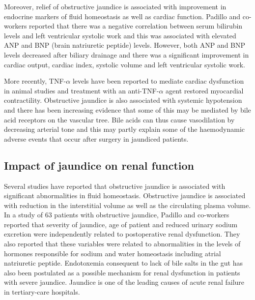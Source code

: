 Moreover, relief of obstructive jaundice is associated with improvement in endocrine markers of fluid homeostasis as well as cardiac function. \parencite{padillo_improved_2001, gallardo_increased_1998} Padillo and co-workers reported that there was a negative correlation between serum bilirubin levels and left ventricular systolic work and this was associated with elevated ANP and BNP (brain natriuretic peptide) levels. However, both ANP and BNP levels decreased after biliary drainage and there was a significant improvement in cardiac output, cardiac index, systolic volume and left ventricular systolic work.\parencite{padillo_improved_2001}
	
More recently, TNF-$\alpha$ levels have been reported to mediate cardiac dysfunction in animal studies and treatment with an anti-TNF-$\alpha$ agent restored myocardial contractility.\parencite{yang_mechanisms_2010} Obstructive jaundice is also associated with systemic hypotension and there has been increasing evidence that some of this may be mediated by bile acid receptors on the vascular tree.\parencite{green_systemic_1995, lefebvre_role_2009} Bile acids can thus cause vasodilation by decreasing arterial tone and this may partly explain some of the haemodynamic adverse events that occur after surgery in jaundiced patients.

\subsection{Impact of jaundice on renal function}

Several studies have reported that obstructive jaundice is associated with significant abnormalities in fluid homeostasis. Obstructive jaundice is associated with reduction in the interstitial volume as well as the circulating plasma volume.\parencite{sitges-serra_body_1992, padillo_preoperative_1999} In a study of 63 patients with obstructive jaundice, Padillo and co-workers reported that severity of jaundice, age of patient and reduced urinary sodium excretion were independently related to postoperative renal dysfunction. They also reported that these variables were related to abnormalities in the levels of hormones responsible for sodium and water homeostasis including atrial natriuretic peptide.\parencite{padillo_multivariate_2005} Endotoxemia consequent to lack of bile salts in the gut has also been postulated as a possible mechanism for renal dysfunction in patients with severe jaundice.\parencite{bailey_endotoxin_1976} Jaundice is one of the leading causes of acute renal failure in tertiary-care hospitals.\parencite{liano_epidemiology_1996}

